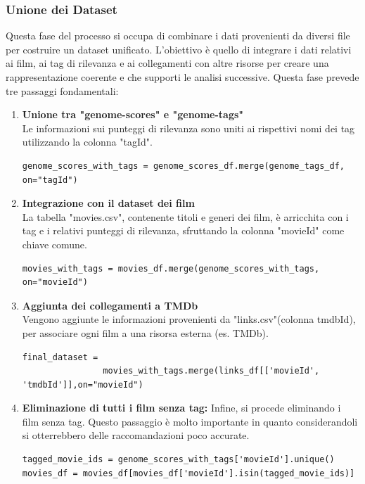 \documentclass[a4paper,12pt]{article}
\begin{document}
        \subsubsection{Unione dei Dataset}
	\label{sec:unione-dataset}
	Questa fase del processo si occupa di combinare i dati provenienti da diversi file per costruire un dataset unificato.
	L'obiettivo è quello di integrare i dati relativi ai film, ai tag di rilevanza e ai collegamenti con altre risorse per creare una rappresentazione coerente e che supporti le analisi successive. Questa fase prevede tre passaggi fondamentali:
			\begin{enumerate}
   			 \item \textbf{Unione tra "genome-scores" e "genome-tags"} \\
				Le informazioni sui punteggi di rilevanza sono uniti ai rispettivi nomi dei tag utilizzando la colonna "tagId".

\begin{verbatim}
genome_scores_with_tags = genome_scores_df.merge(genome_tags_df, on="tagId")
\end{verbatim}

    			 \item \textbf{Integrazione con il dataset dei film} \\
				La tabella "movies.csv", contenente titoli e generi dei film, è arricchita con i tag e i relativi punteggi di rilevanza, sfruttando la colonna "movieId" come chiave comune.
\begin{verbatim}
movies_with_tags = movies_df.merge(genome_scores_with_tags, on="movieId")
\end{verbatim}

			 \item \textbf{Aggiunta dei collegamenti a TMDb}\\
				Vengono aggiunte le informazioni provenienti da "links.csv"(colonna tmdbId), per associare ogni film a una risorsa esterna  (es. TMDb).
				
\begin{verbatim}
final_dataset = 
				movies_with_tags.merge(links_df[['movieId', 'tmdbId']],on="movieId")
\end{verbatim}
			\item \textbf{Eliminazione di tutti i film senza tag: }
				Infine, si procede eliminando i film senza tag. Questo passaggio è molto importante in quanto considerandoli si otterrebbero delle raccomandazioni poco accurate.
\begin{verbatim}
tagged_movie_ids = genome_scores_with_tags['movieId'].unique()
movies_df = movies_df[movies_df['movieId'].isin(tagged_movie_ids)]
\end{verbatim}

		\end{enumerate}
\end{document}
